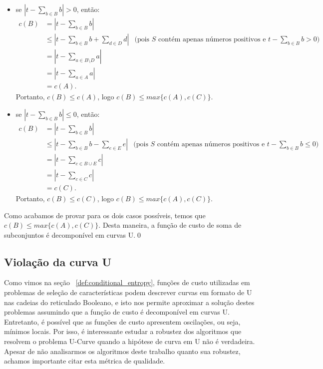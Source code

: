 \begin{itemize}
    \item{se $|t - \sum_{b \in B} b| > 0$, então:}
    \begin{align*}
        c (B) & =  |t - \sum_{b \in B} b|  & \\
              & \leq  |t - \sum_{b \in B} b + \sum_{d \in D} d| & 
                \text{(pois $S$ contém apenas números positivos e $t -
                \sum_{b \in B} b > 0$)} \\
              & = |t - \sum_{a \in B \setminus D} a| \\
              & = |t - \sum_{a \in A} a| \\
              & = c (A).
    \end{align*}
    Portanto, $c (B) \leq  c (A)$, logo $c (B) \leq max \{c (A), c (C)\}$.
    
    \item{se $|t - \sum_{b \in B} b| \leq 0$, então:}
    \begin{align*}
        c (B) & =  |t - \sum_{b \in B} b|  & \\
              & \leq  |t - \sum_{b \in B} b - \sum_{e \in E} e| & 
                \text{(pois $S$ contém apenas números positivos e $t -
                \sum_{b \in B} b \leq 0$)} \\
              & = |t - \sum_{c \in B \cup E} c| \\
              & = |t - \sum_{c \in C} c| \\
              & = c (C).
    \end{align*}
    Portanto, $c (B) \leq  c (C)$, logo $c (B) \leq max \{c (A), c (C)\}$.
\end{itemize}
Como acabamos de provar para os dois casos possíveis, temos que 
$c (B) \leq max \{c (A), c (C)\}$. Desta maneira, a função de custo de
soma de subconjuntos é decomponível em curvas U.\qed

\subsection{Violação da curva U}
Como vimos na seção ~\ref{def:conditional_entropy}, funções de custo 
utilizadas em problemas de seleção de características podem descrever 
curvas em formato de U nas cadeias do reticulado Booleano, e isto nos 
permite aproximar a solução destes problemas assumindo que a função de 
custo é decomponível em curvas U. Entretanto, é possível que as funções
de custo apresentem oscilações, ou seja, mínimos locais. Por isso, é 
interessante estudar a robustez dos algoritmos que resolvem o problema 
U-Curve quando a hipótese de curva em U não é verdadeira. Apesar de não 
analisarmos os algoritmos deste trabalho quanto sua robustez, achamos 
importante citar esta métrica de qualidade.

